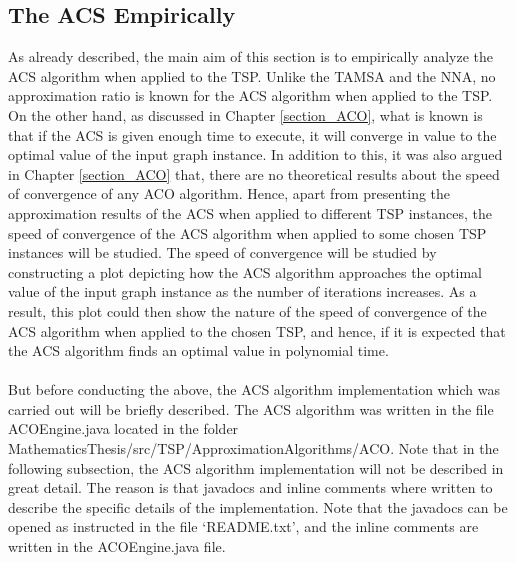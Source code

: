 \documentclass[12pt]{article}
\numberwithin{equation}{subsection}
\numberwithin{table}{subsection}
\numberwithin{algorithm}{subsection}
\numberwithin{figure}{subsection}
\begin{document}
\subsection{The ACS Empirically}
As already described, the main aim of this section is to empirically analyze the ACS algorithm when applied to the TSP. Unlike the TAMSA and the NNA, no approximation ratio is known for the ACS algorithm when applied to the TSP. On the other hand, as discussed in Chapter \ref{section_ACO}, what is known is that if the ACS is given enough time to execute, it will converge in value to the optimal value of the input graph instance. In addition to this, it was also argued in Chapter \ref{section_ACO} that, there are no theoretical results about the speed of convergence of any ACO algorithm. Hence, apart from presenting the approximation results of the ACS when applied to different TSP instances, the speed of convergence of the ACS algorithm when applied to some chosen TSP instances will be studied. The speed of convergence will be studied by constructing a plot depicting how the ACS algorithm approaches the optimal value of the input graph instance as the number of iterations increases. As a result, this plot could then show the nature of the speed of convergence of the ACS algorithm when applied to the chosen TSP, and hence, if it is expected that the ACS algorithm finds an optimal value in polynomial time.\\\\
But before conducting the above, the ACS algorithm implementation which was carried out will be briefly described. The ACS algorithm was written in the file ACOEngine.java located in the folder MathematicsThesis/src/TSP/ApproximationAlgorithms/ACO. Note that in the following subsection, the ACS algorithm implementation will not be described in great detail. The reason is that javadocs and inline comments where written to describe the specific details of the implementation. Note that the javadocs can be opened as instructed in the file `README.txt', and the inline comments are written in the ACOEngine.java file.
\end{document}
